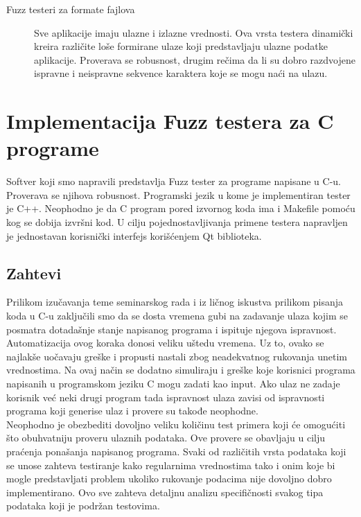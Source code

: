 \documentclass[a4paper]{article}
\begin{document}
{\begin{description}
\item[Fuzz testeri za formate fajlova]
Sve aplikacije imaju ulazne i izlazne vrednosti. Ova vrsta testera
dinamički kreira različite loše formirane ulaze koji predstavljaju ulazne podatke aplikacije. Proverava se robusnost, drugim rečima da li su dobro 
razdvojene ispravne i neispravne sekvence karaktera koje se mogu naći na ulazu.
\end{description}

\section{Implementacija Fuzz testera za C programe}
\label{sec:implementacija_fuzz_testera}

Softver koji smo napravili predstavlja Fuzz tester za programe napisane u C-u. Proverava se njihova robusnost. Programski jezik u kome je implementiran tester je C++. Neophodno je da C program pored izvornog koda ima i Makefile pomoću kog se dobija izvršni kod. U cilju pojednostavljivanja primene testera napravljen je jednostavan korisnički interfejs korišćenjem Qt biblioteka. 

\subsection{Zahtevi}
\label{subsec:zahtevi_testera}

Prilikom izučavanja teme seminarskog rada i iz ličnog iskustva prilikom pisanja koda u C-u zaključili smo da se dosta vremena gubi na zadavanje ulaza kojim se posmatra dotadašnje stanje napisanog programa i ispituje njegova ispravnost. Automatizacija ovog koraka donosi veliku uštedu vremena. Uz to, ovako se najlakše uočavaju greške i propusti nastali zbog neadekvatnog rukovanja unetim vrednostima. Na ovaj način se dodatno simuliraju i greške koje korisnici programa napisanih u programskom jeziku C mogu zadati kao input. Ako ulaz ne zadaje korisnik već neki drugi program tada ispravnost ulaza zavisi od ispravnosti programa koji generise ulaz i provere su takođe neophodne.\\

Neophodno je obezbediti dovoljno veliku količinu test primera koji će omogućiti što obuhvatniju proveru ulaznih podataka. Ove provere se obavljaju u cilju praćenja ponašanja napisanog programa. Svaki od različitih vrsta podataka koji se unose zahteva testiranje kako regularnima vrednostima tako i onim koje bi mogle predstavljati problem ukoliko rukovanje podacima nije dovoljno dobro implementirano. Ovo sve zahteva detaljnu analizu specifičnosti svakog tipa podataka koji je podržan testovima.

}
\end{document}
